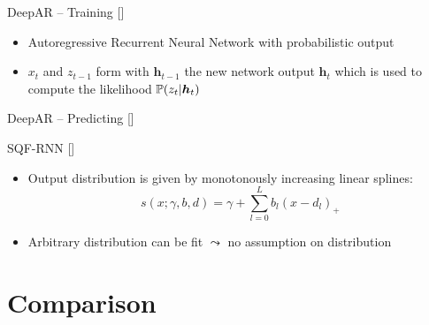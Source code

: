 \documentclass[10pt,aspectratio=169]{beamer}
\begin{document}
\begin{frame}[fragile]{DeepAR -- Training [\cite{Salinas2017}]}
    \begin{center}
        
    \end{center}
    \begin{itemize}
        \item Autoregressive Recurrent Neural Network with probabilistic output
        \item \(x_t\) and \(z_{t-1}\) form with \(\boldsymbol{h}_{t-1}\) the new network output \(\boldsymbol{h}_t\)
        which is used to compute the likelihood \(\P(z_t | \boldsymbol{h}_t)\)
    \end{itemize}
\end{frame}

\begin{frame}[fragile]{DeepAR -- Predicting [\cite{Salinas2017}]}
    \begin{center}
        
    \end{center}
    \begin{itemize}
    \end{itemize}
\end{frame}

\begin{frame}{SQF-RNN [\cite{Gasthaus2019}]}
    \begin{itemize}
        \item Output distribution is given by monotonously increasing linear splines: 
        \[ s(x; \gamma, b, d) = \gamma + \sum_{l=0}^L b_l (x - d_l)_+ \]
        \item Arbitrary distribution can be fit \(\leadsto\) no assumption on distribution
    \end{itemize}
\end{frame}

\section{Comparison}
\end{document}
